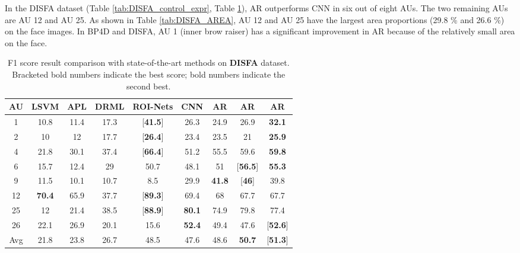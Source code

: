 \documentclass[5p,twocolumn]{elsarticle}
\begin{document}
In the DISFA dataset (Table \ref{tab:DISFA_control_expr}, Table \ref{tab:DISFA_F1}), AR outperforms CNN in six out of eight AUs. The two remaining AUs are AU 12 and AU 25. As shown in Table \ref{tab:DISFA_AREA}, AU 12 and AU 25 have the largest area proportions (29.8 \% and 26.6 \%) on the face images. In BP4D and DISFA, AU 1 (inner brow raiser) has a significant improvement in AR because of the relatively small area on the face.
 \begin{table}
	\scriptsize
	\centering
	
	\setlength{\abovecaptionskip}{0pt} 
	
	\caption{F1 score result comparison with state-of-the-art methods on \textbf{DISFA} dataset. Bracketed bold numbers indicate the best score; bold numbers indicate the second best.}
	\label{tab:DISFA_F1}
	
	\centering
	\tabcolsep=0.05cm
	\begin{tabular}{c*{6}{c}cc}
		
		\toprule
		AU & LSVM & APL \cite{zhong2015learning} & DRML \cite{Zhao2016b} & ROI-Nets \cite{li2017action} & CNN & AR & AR & AR \\
		\midrule
	1 & 10.8 & 11.4 & 17.3 & [\textbf{41.5}] & 26.3 & 24.9 & 26.9 & \textbf{32.1} \\
	2 & 10 & 12 & 17.7 & [\textbf{26.4}] & 23.4 & 23.5 & 21 & \textbf{25.9} \\4 & 21.8 & 30.1 & 37.4 & [\textbf{66.4}] & 51.2 & 55.5 & 59.6 & \textbf{59.8} \\
	6 & 15.7 & 12.4 & 29 & 50.7 & 48.1 & 51 & [\textbf{56.5}] & \textbf{55.3} \\9 & 11.5 & 10.1 & 10.7 & 8.5 & 29.9 & \textbf{41.8} & [\textbf{46}] & 39.8 \\
	12 & \textbf{70.4} & 65.9 & 37.7 & [\textbf{89.3}] & 69.4 & 68 & 67.7 & 67.7 \\
	25 & 12 & 21.4 & 38.5 & [\textbf{88.9}] & \textbf{80.1} & 74.9 & 79.8 & 77.4 \\26 & 22.1 & 26.9 & 20.1 & 15.6 & \textbf{52.4} & 49.4 & 47.6 & [\textbf{52.6}] \\
	\midrule
	Avg & 21.8 & 23.8 & 26.7 & 48.5 & 47.6 & 48.6 & \textbf{50.7} & [\textbf{51.3}] \\
		\bottomrule
	\end{tabular}
	\vspace{-0.0cm}
\end{table}
\end{document}
